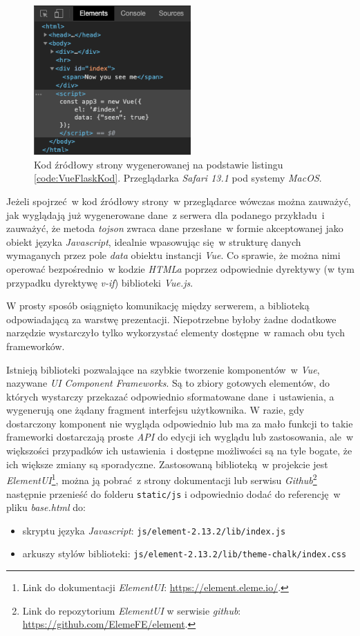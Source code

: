 \begin{figure}[h!]
	\centering
		\includegraphics[width=6cm]{Rysunki/Rozdzial4/VueFlaskKod.png}
		\caption{Kod źródłowy strony wygenerowanej na podstawie listingu \ref{code:VueFlaskKod}. Przeglądarka \textit{Safari 13.1} pod systemy \textit{MacOS}.}	
		\label{fig:kodFlaskVue}
	\end{figure}
	

Jeżeli spojrzeć~w kod źródłowy strony~w przeglądarce wówczas można zauważyć, jak wyglądają już wygenerowane dane~z serwera dla podanego przykładu~i zauważyć, że metoda \textit{tojson} zwraca dane przesłane~w formie akceptowanej jako obiekt języka \textit{Javascript}, idealnie wpasowując się~w strukturę danych wymaganych przez pole \textit{data} obiektu instancji \textit{Vue}. Co sprawie, że można nimi operować bezpośrednio~w kodzie \textit{HTMLa} poprzez odpowiednie dyrektywy\cite{vuejs} (w tym przypadku dyrektywę \textit{v-if}) biblioteki \textit{Vue.js}.



W prosty sposób osiągnięto komunikację między serwerem, a biblioteką odpowiadającą za warstwę prezentacji. Niepotrzebne byłoby żadne dodatkowe narzędzie wystarczyło tylko wykorzystać elementy dostępne~w ramach obu tych frameworków.

Istnieją biblioteki pozwalające na szybkie tworzenie komponentów~w \textit{Vue}, nazywane \textit{UI Component Frameworks}. Są to zbiory gotowych elementów, do których wystarczy przekazać odpowiednio sformatowane dane~i ustawienia, a wygenerują one żądany fragment interfejsu użytkownika. W razie, gdy dostarczony komponent nie wygląda odpowiednio lub ma za mało funkcji to takie frameworki dostarczają proste \textit{API} do edycji ich wyglądu lub zastosowania, ale~w większości przypadków ich ustawienia~i dostępne możliwości są na tyle bogate, że ich większe zmiany są sporadyczne. Zastosowaną biblioteką~w projekcie jest \textit{ElementUI}\footnote{Link do dokumentacji \textit{ElementUI}: \url{https://element.eleme.io/}.}, można ją pobrać~z strony dokumentacji lub serwisu \textit{Github}\footnote{Link do repozytorium \textit{ElementUI} w serwisie \textit{github}: \url{https://github.com/ElemeFE/element}.} następnie przenieść do folderu \verb|static/js| i odpowiednio dodać do referencję~w pliku \textit{base.html} do:
 \begin{itemize}
  \item skryptu języka \textit{Javascript}: \verb|js/element-2.13.2/lib/index.js|
  \item arkuszy stylów biblioteki: \verb|js/element-2.13.2/lib/theme-chalk/index.css|
\end{itemize}

